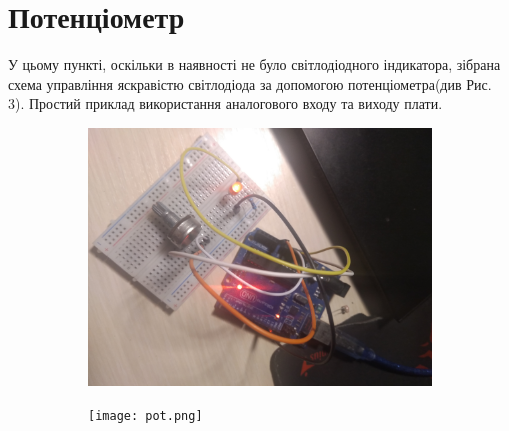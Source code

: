 \documentclass[a4paper,12pt]{article}
\begin{document}
\section{Потенціометр}
\quad У цьому пункті, оскільки в наявності не було світлодіодного індикатора, зібрана схема управління яскравістю світлодіода за допомогою потенціометра(див Рис. 3). Простий приклад використання аналогового входу та виходу плати.
\par\quad\begin{figure}[!h]
  \centering
 \begin{subfigure}[b]{0.6\linewidth}
    \includegraphics[width=\linewidth]{potentiometer.jpg}
  \end{subfigure}
  \caption{}
\end{figure}
\par\quad\begin{figure}[!h]
  \centering
 \begin{subfigure}[b]{1\linewidth}
    \texttt{[image: pot.png]}
  \end{subfigure}
  \caption{}
\end{figure}
\clearpage
\end{document}
